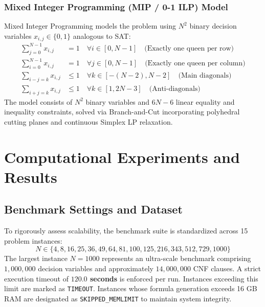 \documentclass[a4paper,fleqn]{cas-sc}
\begin{document}
\subsubsection{Mixed Integer Programming (MIP / 0-1 ILP) Model}
Mixed Integer Programming models the problem using $N^2$ binary decision variables $x_{i,j} \in \{0, 1\}$ analogous to SAT:
\begin{align}
\sum_{j=0}^{N-1} x_{i,j} &= 1 \quad \forall i \in [0, N-1] \quad \text{(Exactly one queen per row)} \\
\sum_{i=0}^{N-1} x_{i,j} &= 1 \quad \forall j \in [0, N-1] \quad \text{(Exactly one queen per column)} \\
\sum_{i-j=k} x_{i,j} &\le 1 \quad \forall k \in [-(N-2), N-2] \quad \text{(Main diagonals)} \\
\sum_{i+j=k} x_{i,j} &\le 1 \quad \forall k \in [1, 2N-3] \quad \text{(Anti-diagonals)}
\end{align}
The model consists of $N^2$ binary variables and $6N - 6$ linear equality and inequality constraints, solved via Branch-and-Cut incorporating polyhedral cutting planes and continuous Simplex LP relaxation.

\section{Computational Experiments and Results}
\label{sec:experiments}

\subsection{Benchmark Settings and Dataset}
\label{subsec:dataset_settings}
To rigorously assess scalability, the benchmark suite is standardized across 15 problem instances:
\begin{equation}
N \in \{4, 8, 16, 25, 36, 49, 64, 81, 100, 125, 216, 343, 512, 729, 1000\}
\end{equation}
The largest instance $N = 1000$ represents an ultra-scale benchmark comprising $1,000,000$ decision variables and approximately $14,000,000$ CNF clauses. A strict execution timeout of \textbf{$120.0$ seconds} is enforced per run. Instances exceeding this limit are marked as \texttt{TIMEOUT}. Instances whose formula generation exceeds 16 GB RAM are designated as \texttt{SKIPPED\_MEMLIMIT} to maintain system integrity.
\end{document}
